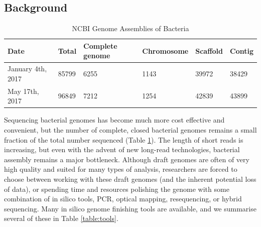\documentclass[11pt]{article}
\begin{document}
\begin{linenumbers}


\section*{Background}
\begin{table}[]
\centering
\caption{NCBI Genome Assemblies of Bacteria}
\label{table:completions}
\begin{tabular}{llllll}
  Date              & Total & Complete genome & Chromosome & Scaffold & Contig \\
  \hline
January 4th, 2017 & 85799 & 6255            & 1143       & 39972    & 38429  \\
May 17th, 2017    & 96849 & 7212            & 1254       & 42839    & 43899

\end{tabular}
\end{table}

Sequencing bacterial genomes has become much more cost effective and convenient, but the number of complete, closed bacterial genomes remains a small fraction of the total number sequenced (Table \ref{table:completions}). The length of short reads is increasing, but even with the advent of new long-read technologies, bacterial assembly remains a major bottleneck\cite{Nagarajan2010,Brouwer2016}. Although draft genomes are often of very high quality and suited for many types of analysis, researchers are forced to choose between working with these draft genomes (and the inherent potential loss of data), or spending time and resources polishing the genome with some combination of in silico tools, PCR, optical mapping, resequencing, or hybrid sequencing\cite{Nagarajan2010,Utturkar2014}. Many in silico genome finishing tools are available, and we summarise several of these in Table \ref{table:tools}.





\end{linenumbers}
\end{document}
